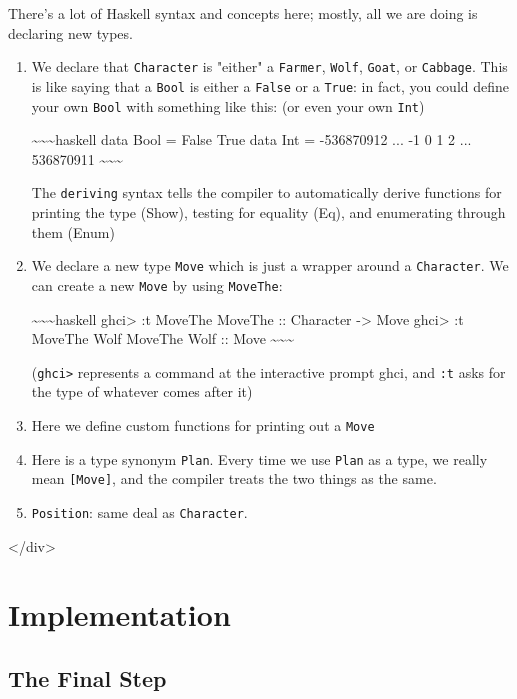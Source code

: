 \documentclass[]{article}
\begin{document}
There's a lot of Haskell syntax and concepts here; mostly, all we are doing is
declaring new types.

\begin{enumerate}
\item
  We declare that \texttt{Character} is "either" a \texttt{Farmer},
  \texttt{Wolf}, \texttt{Goat}, or \texttt{Cabbage}. This is like saying that a
  \texttt{Bool} is either a \texttt{False} or a \texttt{True}: in fact, you
  could define your own \texttt{Bool} with something like this: (or even your
  own \texttt{Int})

  \textasciitilde{}\textasciitilde{}\textasciitilde{}haskell data Bool = False
  \textbar{} True data Int = -536870912 ... \textbar{} -1 \textbar{} 0
  \textbar{} 1 \textbar{} 2 \textbar{} ... 536870911
  \textasciitilde{}\textasciitilde{}\textasciitilde{}

  The \texttt{deriving} syntax tells the compiler to automatically derive
  functions for printing the type (Show), testing for equality (Eq), and
  enumerating through them (Enum)
\item
  We declare a new type \texttt{Move} which is just a wrapper around a
  \texttt{Character}. We can create a new \texttt{Move} by using
  \texttt{MoveThe}:

  \textasciitilde{}\textasciitilde{}\textasciitilde{}haskell ghci\textgreater{}
  :t MoveThe MoveThe :: Character -\textgreater{} Move ghci\textgreater{} :t
  MoveThe Wolf MoveThe Wolf :: Move
  \textasciitilde{}\textasciitilde{}\textasciitilde{}

  (\texttt{ghci\textgreater{}} represents a command at the interactive prompt
  ghci, and \texttt{:t} asks for the type of whatever comes after it)
\item
  Here we define custom functions for printing out a \texttt{Move}
\item
  Here is a type synonym \texttt{Plan}. Every time we use \texttt{Plan} as a
  type, we really mean \texttt{{[}Move{]}}, and the compiler treats the two
  things as the same.
\item
  \texttt{Position}: same deal as \texttt{Character}.
\end{enumerate}

\textless{}/div\textgreater{}

\section{Implementation}

\subsection{The Final Step}
\end{document}
